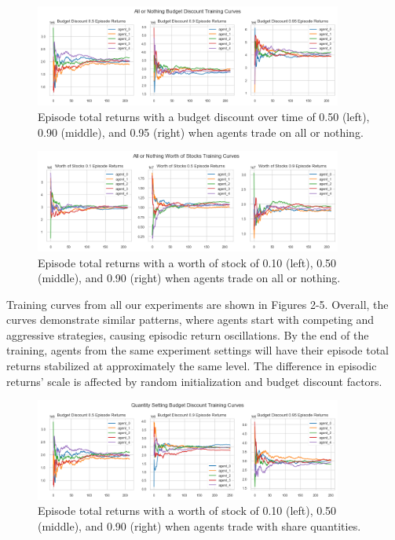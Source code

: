 \documentclass{article}
\begin{document}
\begin{figure}[h!]
    \centering
    \includegraphics[width=0.90\textwidth]{all_or_nothing_budget.png}
    \caption{Episode total returns with a budget discount over time of 0.50 (left), 0.90 (middle), and 0.95 (right) when agents trade on all or nothing.} %
    \label{fig: 2}
\end{figure}

\begin{figure}[h!]
    \centering
    \includegraphics[width=0.90\textwidth]{all_or_nothing_stocks.png}
    \caption{Episode total returns with a worth of stock of 0.10 (left), 0.50 (middle), and 0.90 (right) when agents trade on all or nothing.} %
    \label{fig: 3}
\end{figure}

Training curves from all our experiments are shown in Figures 2-5. Overall, the curves demonstrate similar patterns, where agents start with competing and aggressive strategies, causing episodic return oscillations. By the end of the training, agents from the same experiment settings will have their episode total returns stabilized at approximately the same level. The difference in episodic returns' scale is affected by random initialization and budget discount factors.

\begin{figure}[h!]
    \centering
    \includegraphics[width=0.90\textwidth]{quantity_setting_budget.png}
    \caption{Episode total returns with a worth of stock of 0.10 (left), 0.50 (middle), and 0.90 (right) when agents trade with share quantities.} %
    \label{fig: 4}
\end{figure}
\end{document}
